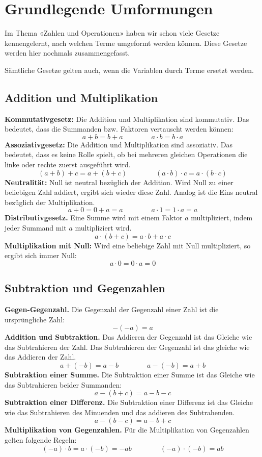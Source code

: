 \newpage
\section{Grundlegende Umformungen}

Im Thema «Zahlen und Operationen» haben wir schon viele Gesetze kennengelernt, nach welchen Terme umgeformt werden können. Diese Gesetze werden hier nochmals zusammengefasst.

Sämtliche Gesetze gelten auch, wenn die Variablen durch Terme ersetzt werden.

\subsection{Addition und Multiplikation}

\textbf{Kommutativgesetz:} Die Addition und Multiplikation sind kommutativ. Das bedeutet, dass die Summanden bzw. Faktoren vertauscht werden können:
\[
  a+b = b+a \qquad\qquad a\cdot b = b\cdot a
\]
\textbf{Assoziativgesetz:} Die Addition und Multiplikation sind assoziativ. Das bedeutet, dass es keine Rolle spielt, ob bei mehreren gleichen Operationen die linke oder rechte zuerst ausgeführt wird.
\[
  (a + b) + c = a + (b + c) \qquad\qquad (a\cdot b)\cdot c = a\cdot(b\cdot c)
\]
\textbf{Neutralität:} Null ist neutral bezüglich der Addition. Wird Null zu einer beliebigen Zahl addiert, ergibt sich wieder diese Zahl. Analog ist die Eins neutral bezüglich der Multiplikation.
\[
  a + 0 = 0 + a = a \qquad\qquad a\cdot 1 = 1\cdot a = a
\]
\textbf{Distributivgesetz.} Eine Summe wird mit einem Faktor $a$ multipliziert, indem jeder Summand mit $a$ multipliziert wird.
\[
  a \cdot (b + c) = a \cdot b + a \cdot c
\]
\textbf{Multiplikation mit Null:} Wird eine beliebige Zahl mit Null multipliziert, so ergibt sich immer Null:
\[
  a\cdot 0 = 0\cdot a = 0
\]

\subsection{Subtraktion und Gegenzahlen}

\textbf{Gegen-Gegenzahl.} Die Gegenzahl der Gegenzahl einer Zahl ist die ursprüngliche Zahl:
\[
  -(-a) = a
\]
\textbf{Addition und Subtraktion.} Das Addieren der Gegenzahl ist das Gleiche wie das Subtrahieren der Zahl. Das Subtrahieren der Gegenzahl ist das gleiche wie das Addieren der Zahl.
\[
  a+(-b) = a-b \qquad\qquad a-(-b) = a+b
\]
\textbf{Subtraktion einer Summe.} Die Subtraktion einer Summe ist das Gleiche wie das Subtrahieren beider Summanden:
\[
  a-(b+c) = a-b-c
\]
\textbf{Subtraktion einer Differenz.} Die Subtraktion einer Differenz ist das Gleiche wie das Subtrahieren des Minuenden und das addieren des Subtrahenden.
\[
  a-(b-c) = a-b+c
\]
\textbf{Multiplikation von Gegenzahlen.} Für die Multiplikation von Gegenzahlen gelten folgende Regeln:
\[
  (-a)\cdot b = a\cdot(-b) = -ab \qquad\qquad  (-a)\cdot(-b) = ab
\]

